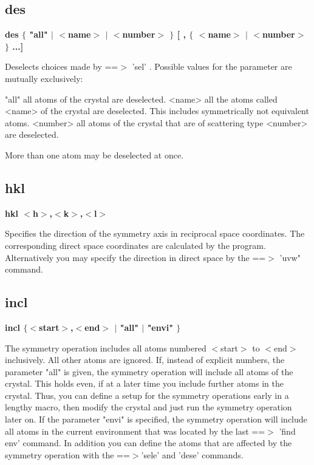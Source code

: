 \subsection*{des}
{\bf des $ \{$ "all" $| $ $ <$name$> $ $| $ $ <$number$> $ $\} $ [ , $ \{$ $ <$name$> $ $| $ $ <$number$> $ $\} $ ...] \par }
\par
\vspace{3pt}
Deselects choices made by ==$> $ 'sel' . Possible values 
for the parameter are mutually exclusively: 
\par
\begin{MacVerbatim}
"all"     all atoms of the crystal are deselected.
<name>    all the atoms called <name> of the crystal are deselected.
          This includes symmetrically not equivalent atoms.
<number>  all atoms of the crystal that are of scattering type <number>
          are deselected.
\end{MacVerbatim}
More than one atom may be deselected at once. 
\subsection*{hkl}
{\bf hkl $ <$h$> $,$ <$k$> $,$ <$l$> $ \par }
\par
\vspace{3pt}
Specifies the direction of the symmetry axis in reciprocal space 
coordinates. The corresponding direct space coordinates are calculated 
by the program. 
Alternatively you may specify the direction in direct space by the 
==$> $ 'uvw" command. 
\subsection*{incl}
{\bf incl $ \{$$ <$start$> $,$ <$end$> $ $| $ "all" $| $ "envi" $\} $ \par }
\par
\vspace{3pt}
The symmetry operation includes all atoms numbered $ <$start$> $ to $ <$end$> $ 
inclusively. All other atoms are ignored. 
If, instead of explicit numbers, the parameter "all" is given, the 
symmetry operation will include all atoms of the crystal. This holds 
even, if at a later time you include further atoms in the crystal. 
Thus, you can define a setup for the symmetry operations early in a 
lengthy macro, then modify the crystal and just run the symmetry 
operation later on. 
If the parameter "envi" is specified, the symmetry operation will 
include all atoms in the current environment that was located by the 
last ==$> $ 'find env' command. 
In addition you can define the atoms that are affected by the 
symmetry operation with the ==$> $'sele' and 'dese' commands. 
